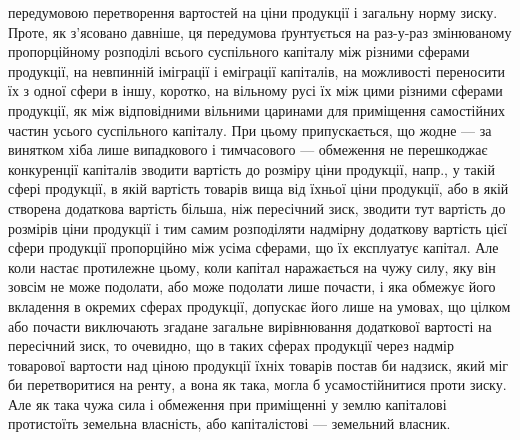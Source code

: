 \parcont{}  %
передумовою перетворення вартостей на ціни продукції і загальну норму зиску. Проте, як з’ясовано
давніше, ця передумова ґрунтується на раз-у-раз змінюваному пропорційному розподілі всього
суспільного капіталу між різними сферами продукції, на невпинній іміграції і еміграції капіталів, на
можливості переносити їх з одної сфери в іншу, коротко, на вільному русі їх між цими різними сферами
продукції, як між відповідними вільними
царинами для приміщення самостійних частин усього суспільного капіталу. При цьому припускається, що
жодне — за винятком хіба лише випадкового і тимчасового — обмеження не перешкоджає конкуренції
капіталів зводити вартість до розміру ціни продукції, напр., у такій сфері продукції, в якій
вартість товарів вища від їхньої ціни продукції, або в якій створена додаткова вартість більша, ніж
пересічний зиск, зводити тут вартість до розмірів ціни продукції і тим самим розподіляти надмірну
додаткову вартість цієї сфери продукції пропорційно між усіма сферами,
що їх експлуатує капітал. Але коли настає протилежне цьому, коли капітал
наражається на чужу силу, яку він зовсім не може подолати, або може подолати
лише почасти, і яка обмежує його вкладення в окремих сферах продукції,
допускає його лише на умовах, що цілком або почасти виключають
згадане загальне вирівнювання додаткової вартості на пересічний зиск, то очевидно, що в таких сферах
продукції через надмір товарової вартости над ціною продукції їхніх товарів постав би надзиск, який
міг би перетворитися на ренту, а вона як така, могла б усамостійнитися проти зиску. Але як така чужа
сила і обмеження при приміщенні у землю капіталові протистоїть земельна власність, або капіталістові
— земельний власник.

